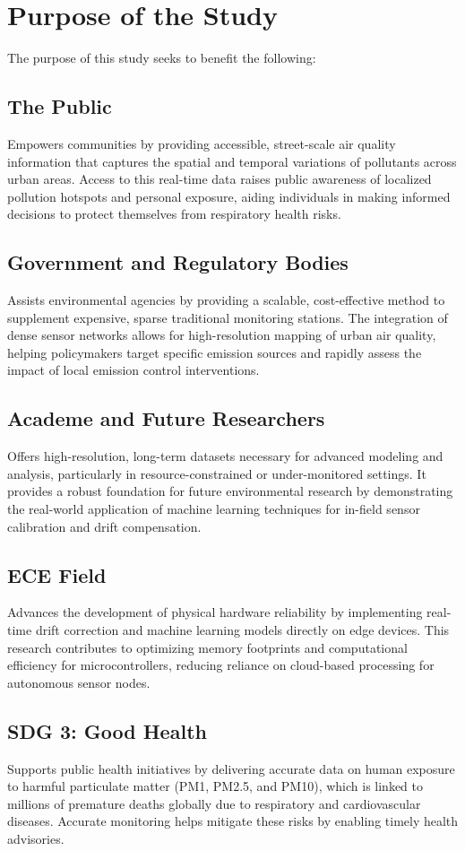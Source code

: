 \section{Purpose of the Study}
The purpose of this study seeks to benefit the following:
\subsection{The Public}
Empowers communities by providing accessible, street-scale air quality information that captures the spatial and temporal variations of pollutants across urban areas. Access to this real-time data raises public awareness of localized pollution hotspots and personal exposure, aiding individuals in making informed decisions to protect themselves from respiratory health risks.
\subsection{Government and Regulatory Bodies}
Assists environmental agencies by providing a scalable, cost-effective method to supplement expensive, sparse traditional monitoring stations. The integration of dense sensor networks allows for high-resolution mapping of urban air quality, helping policymakers target specific emission sources and rapidly assess the impact of local emission control interventions.
\subsection{Academe and Future Researchers}
Offers high-resolution, long-term datasets necessary for advanced modeling and analysis, particularly in resource-constrained or under-monitored settings. It provides a robust foundation for future environmental research by demonstrating the real-world application of machine learning techniques for in-field sensor calibration and drift compensation.
\subsection{ECE Field}
Advances the development of physical hardware reliability by implementing real-time drift correction and machine learning models directly on edge devices. This research contributes to optimizing memory footprints and computational efficiency for microcontrollers, reducing reliance on cloud-based processing for autonomous sensor nodes. 
\subsection{SDG 3: Good Health}
Supports public health initiatives by delivering accurate data on human exposure to harmful particulate matter (PM1, PM2.5, and PM10), which is linked to millions of premature deaths globally due to respiratory and cardiovascular diseases. Accurate monitoring helps mitigate these risks by enabling timely health advisories.
